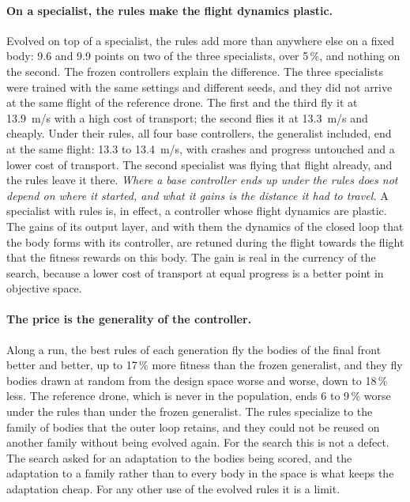 \paragraph{On a specialist, the rules make the flight dynamics plastic.} Evolved on top of a specialist, the rules add more than anywhere else on a fixed body: 9.6 and 9.9 points on two of the three specialists, over 5\,\%, and nothing on the second. The frozen controllers explain the difference. The three specialists were trained with the same settings and different seeds, and they did not arrive at the same flight of the reference drone. The first and the third fly it at 13.9~m/s with a high cost of transport; the second flies it at 13.3~m/s and cheaply. Under their rules, all four base controllers, the generalist included, end at the same flight: 13.3 to 13.4~m/s, with crashes and progress untouched and a lower cost of transport. The second specialist was flying that flight already, and the rules leave it there. \emph{Where a base controller ends up under the rules does not depend on where it started, and what it gains is the distance it had to travel.} A specialist with rules is, in effect, a controller whose flight dynamics are plastic. The gains of its output layer, and with them the dynamics of the closed loop that the body forms with its controller, are retuned during the flight towards the flight that the fitness rewards on this body. The gain is real in the currency of the search, because a lower cost of transport at equal progress is a better point in objective space.

\paragraph{The price is the generality of the controller.} Along a run, the best rules of each generation fly the bodies of the final front better and better, up to 17\,\% more fitness than the frozen generalist, and they fly bodies drawn at random from the design space worse and worse, down to 18\,\% less. The reference drone, which is never in the population, ends 6 to 9\,\% worse under the rules than under the frozen generalist. The rules specialize to the family of bodies that the outer loop retains, and they could not be reused on another family without being evolved again. For the search this is not a defect. The search asked for an adaptation to the bodies being scored, and the adaptation to a family rather than to every body in the space is what keeps the adaptation cheap. For any other use of the evolved rules it is a limit.

